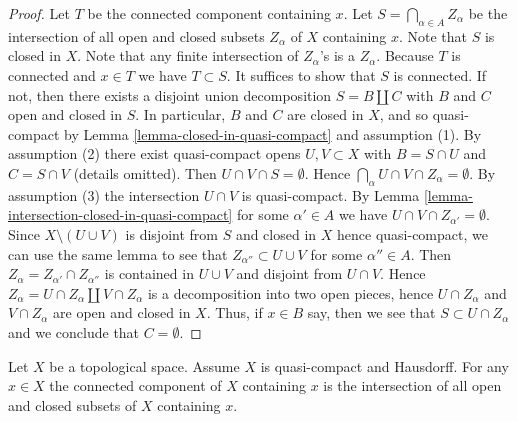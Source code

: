 \begin{proof}
Let $T$ be the connected component containing $x$.
Let $S = \bigcap_{\alpha \in A} Z_\alpha$ be the intersection of all
open and closed subsets $Z_\alpha$ of $X$ containing $x$.
Note that $S$ is closed in $X$.
Note that any finite intersection of $Z_\alpha$'s is a $Z_\alpha$.
Because $T$ is connected and $x \in T$ we have $T \subset S$.
It suffices to show that $S$ is connected.
If not, then there exists a disjoint union decomposition
$S = B \coprod C$ with $B$ and $C$ open and closed in $S$.
In particular, $B$ and $C$ are closed in $X$, and so quasi-compact by
Lemma \ref{lemma-closed-in-quasi-compact} and assumption (1).
By assumption (2) there exist quasi-compact opens
$U, V \subset X$ with $B = S \cap U$ and $C = S \cap V$ (details omitted).
Then $U \cap V \cap S = \emptyset$.
Hence $\bigcap_\alpha U \cap V \cap Z_\alpha = \emptyset$.
By assumption (3) the intersection $U \cap V$ is quasi-compact.
By Lemma \ref{lemma-intersection-closed-in-quasi-compact}
for some $\alpha' \in A$ we have $U \cap V \cap Z_{\alpha'} = \emptyset$.
Since $X \setminus (U \cup V)$ is disjoint from $S$
and closed in $X$ hence quasi-compact, we can use the same lemma
to see that $Z_{\alpha''} \subset U \cup V$ for some $\alpha'' \in A$.
Then $Z_\alpha = Z_{\alpha'} \cap Z_{\alpha''}$ is contained
in $U \cup V$ and disjoint from $U \cap V$.
Hence $Z_\alpha = U \cap Z_\alpha \coprod V \cap Z_\alpha$
is a decomposition into two open pieces,
hence $U \cap Z_\alpha$ and $V \cap Z_\alpha$ are open and closed in $X$.
Thus, if $x \in B$ say, then we see that $S \subset U \cap Z_\alpha$
and we conclude that $C = \emptyset$.
\end{proof}

\begin{lemma}
\label{lemma-connected-component-intersection-compact-Hausdorff}
Let $X$ be a topological space. Assume $X$ is quasi-compact and Hausdorff.
For any $x \in X$ the connected component of $X$ containing
$x$ is the intersection of all open and closed subsets
of $X$ containing $x$.
\end{lemma}

